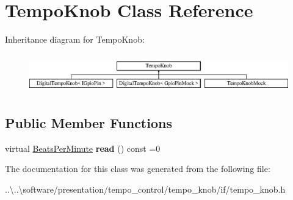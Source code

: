 \hypertarget{class_tempo_knob}{}\section{Tempo\+Knob Class Reference}
\label{class_tempo_knob}
Inheritance diagram for Tempo\+Knob\+:\begin{figure}[H]
\begin{center}
\leavevmode
\includegraphics[height=1.696970cm]{class_tempo_knob}
\end{center}
\end{figure}
\subsection*{Public Member Functions}
\begin{DoxyCompactItemize}
\item 
\mbox{\label{class_tempo_knob_aac8920db810057a523201b0027d6c852}} 
virtual \mbox{\hyperlink{class_beats_per_minute}{Beats\+Per\+Minute}} {\bfseries read} () const =0
\end{DoxyCompactItemize}


The documentation for this class was generated from the following file\+:\begin{DoxyCompactItemize}
\item 
..\textbackslash{}..\textbackslash{}software/presentation/tempo\+\_\+control/tempo\+\_\+knob/if/tempo\+\_\+knob.\+h\end{DoxyCompactItemize}
